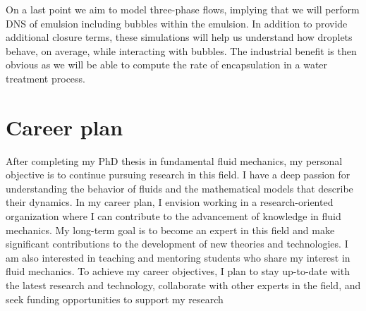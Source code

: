 On a last point we aim to model three-phase flows, implying that we will perform DNS of emulsion including bubbles within the emulsion. 
In addition to provide additional closure terms, these simulations will help us understand how droplets behave, on average, while interacting with bubbles. 
The industrial benefit is then obvious as we will be able to compute the rate of encapsulation in a water treatment process. 

\section*{Career plan}

After completing my PhD thesis in fundamental fluid mechanics, my personal objective is to continue pursuing research in this field. 
I have a deep passion for understanding the behavior of fluids and the mathematical models that describe their dynamics. 
In my career plan, I envision working in a research-oriented organization where I can contribute to the advancement of knowledge in fluid mechanics. 
My long-term goal is to become an expert in this field and make significant contributions to the development of new theories and technologies. 
I am also interested in teaching and mentoring students who share my interest in fluid mechanics. 
To achieve my career objectives, I plan to stay up-to-date with the latest research and technology, collaborate with other experts in the field, and seek funding opportunities to support my research